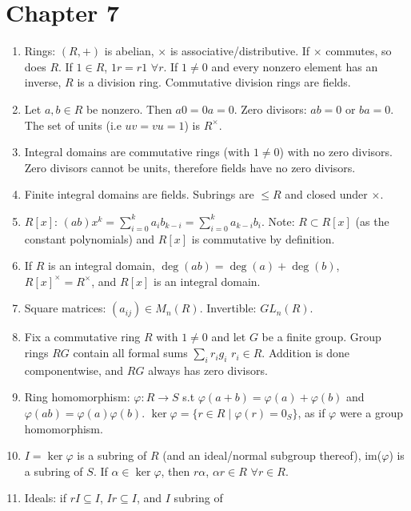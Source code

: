 \documentclass{article}
\begin{document}
\section*{Chapter 7}

\begin{enumerate}[1.]
    \item Rings: $(R, +)$ is abelian, $\times$ is associative/distributive.
        If $\times$ commutes, so does $R$. If $1 \in R$, $1r = r1$ $\forall
        r$. If $1 \not= 0$ and every nonzero element has an inverse, $R$ is
        a division ring. Commutative division rings are fields.
    \item Let $a,b \in R$ be nonzero. Then $a0 = 0a = 0$. Zero divisors: 
        $ab = 0$ or $ba = 0$. The set of units (i.e $uv = vu = 1$) is
        $R^{\times}$.
    \item Integral domains are commutative rings (with $1 \not= 0$)
        with no zero divisors. Zero divisors cannot be units, therefore
        fields have no zero divisors. 
    \item Finite integral domains are fields. Subrings are $\leq R$ and
        closed under $\times$.
    \item $R[x]$: $(ab)x^k = \sum_{i=0}^k a_ib_{k-i} =
        \sum_{i=0}^k a_{k-i}b_i$. Note: $R \subset R[x]$ (as the constant
        polynomials) and $R[x]$ is commutative by definition.
    \item If $R$ is an integral domain, $\deg(ab) = \deg(a) + \deg(b)$,
        $R[x]^{\times} = R^{\times}$, and $R[x]$ is an integral domain.
    \item Square matrices: $(a_{ij}) \in M_n(R)$. Invertible: $GL_n(R)$.
    \item Fix a commutative ring $R$ with $1 \not= 0$ and let
        $G$ be a finite group. Group rings $RG$ contain all formal sums
        $\sum_i r_ig_i$ $r_i \in R$. Addition is done componentwise, and
        $RG$ always has zero divisors.
    \item Ring homomorphism: $\varphi : R \rightarrow S$ s.t $\varphi(a + b) =
        \varphi(a) + \varphi(b)$ and $\varphi(ab) = \varphi(a)\varphi(b)$.
        $\ker \varphi = \{r \in R \mid \varphi(r) = 0_S\}$, as if $\varphi$
        were a group homomorphism.
    \item $I = \ker \varphi$ is a subring of $R$ (and an ideal/normal subgroup
        thereof), im($\varphi$) is a subring of $S$. 
        If $\alpha \in \ker \varphi$, then $r\alpha$, $\alpha r \in R$
        $\forall r \in R$.
    \item Ideals: if $rI \subseteq I$, $Ir \subseteq I$, and $I$ subring of

\end{enumerate}
\end{document}
